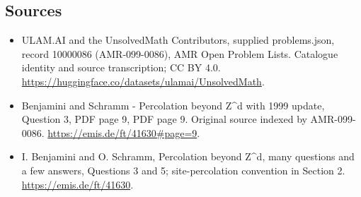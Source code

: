 \documentclass[11pt,a4paper]{article}
\begin{document}
\subsection{Sources}
\begin{itemize}
\item[S1] ULAM.AI and the UnsolvedMath Contributors, supplied problems.json, record 10000086 (AMR-099-0086), AMR Open Problem Lists. Catalogue identity and source transcription; CC BY 4.0.
\url{https://huggingface.co/datasets/ulamai/UnsolvedMath}.
\item[S2] Benjamini and Schramm - Percolation beyond Z\textasciicircum{}d with 1999 update, Question 3, PDF page 9, PDF page 9. Original source indexed by AMR-099-0086.
\url{https://emis.de/ft/41630#page=9}.
\item[S3] I. Benjamini and O. Schramm, Percolation beyond Z\textasciicircum{}d, many questions and a few answers, Questions 3 and 5; site-percolation convention in Section 2.
\url{https://emis.de/ft/41630}.
\end{itemize}
\end{document}
